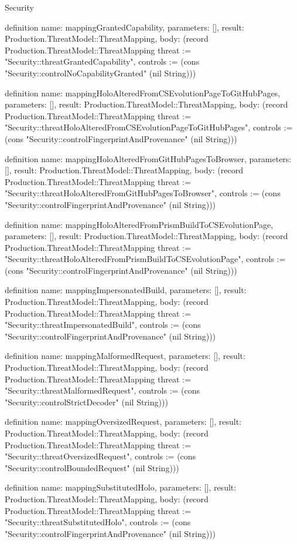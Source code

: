 \begin{lexlean}{Security}
\begin{semanticmodule}
definition{
  name: mappingGrantedCapability,
  parameters: [],
  result: Production.ThreatModel::ThreatMapping,
  body: (record Production.ThreatModel::ThreatMapping {threat := "Security::threatGrantedCapability", controls := (cons "Security::controlNoCapabilityGranted" (nil String))})
}

definition{
  name: mappingHoloAlteredFromCSEvolutionPageToGitHubPages,
  parameters: [],
  result: Production.ThreatModel::ThreatMapping,
  body: (record Production.ThreatModel::ThreatMapping {threat := "Security::threatHoloAlteredFromCSEvolutionPageToGitHubPages", controls := (cons "Security::controlFingerprintAndProvenance" (nil String))})
}

definition{
  name: mappingHoloAlteredFromGitHubPagesToBrowser,
  parameters: [],
  result: Production.ThreatModel::ThreatMapping,
  body: (record Production.ThreatModel::ThreatMapping {threat := "Security::threatHoloAlteredFromGitHubPagesToBrowser", controls := (cons "Security::controlFingerprintAndProvenance" (nil String))})
}

definition{
  name: mappingHoloAlteredFromPrismBuildToCSEvolutionPage,
  parameters: [],
  result: Production.ThreatModel::ThreatMapping,
  body: (record Production.ThreatModel::ThreatMapping {threat := "Security::threatHoloAlteredFromPrismBuildToCSEvolutionPage", controls := (cons "Security::controlFingerprintAndProvenance" (nil String))})
}

definition{
  name: mappingImpersonatedBuild,
  parameters: [],
  result: Production.ThreatModel::ThreatMapping,
  body: (record Production.ThreatModel::ThreatMapping {threat := "Security::threatImpersonatedBuild", controls := (cons "Security::controlFingerprintAndProvenance" (nil String))})
}

definition{
  name: mappingMalformedRequest,
  parameters: [],
  result: Production.ThreatModel::ThreatMapping,
  body: (record Production.ThreatModel::ThreatMapping {threat := "Security::threatMalformedRequest", controls := (cons "Security::controlStrictDecoder" (nil String))})
}

definition{
  name: mappingOversizedRequest,
  parameters: [],
  result: Production.ThreatModel::ThreatMapping,
  body: (record Production.ThreatModel::ThreatMapping {threat := "Security::threatOversizedRequest", controls := (cons "Security::controlBoundedRequest" (nil String))})
}

definition{
  name: mappingSubstitutedHolo,
  parameters: [],
  result: Production.ThreatModel::ThreatMapping,
  body: (record Production.ThreatModel::ThreatMapping {threat := "Security::threatSubstitutedHolo", controls := (cons "Security::controlFingerprintAndProvenance" (nil String))})
}


\end{semanticmodule}
\end{lexlean}
